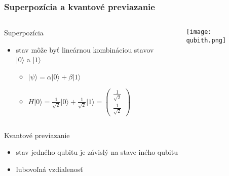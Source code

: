 \documentclass{beamer}
\newcommand{\ket}[1]{\lvert#1\rangle} %
\begin{document}
\begin{frame}[t]
	\frametitle{Superpozícia a kvantové previazanie}
	\begin{columns}[t]
		\begin{column}{.7\textwidth}
			Superpozícia

		\begin{itemize}
			\item stav môže byť lineárnou kombináciou stavov $\ket{0}$ a $\ket{1}$ 
			\begin{itemize}
			\item $\ket{\psi} = \alpha\ket{0} + \beta\ket{1}$
			\item $H\ket{0} = \frac{1}{\sqrt{2}}\ket{0} + \frac{1}{\sqrt{2}}\ket{1} = \begin{pmatrix}
				\frac{1}{\sqrt{2}}\\
				\frac{1}{\sqrt{2}}
				\end{pmatrix}$
		\end{itemize}
				
		\end{itemize}
	\end{column}
		\begin{column}{.3\textwidth}
			\centering
			
			\begin{figure}
				\centering
				\texttt{[image: qubith.png]}            
			\end{figure}
		\end{column}
	\end{columns}
	
	Kvantové previazanie
	\begin{itemize}
		\item stav jedného qubitu je závislý na stave iného qubitu
		\item ľubovoľná vzdialenosť 
	\end{itemize}
\end{frame}
\end{document}
